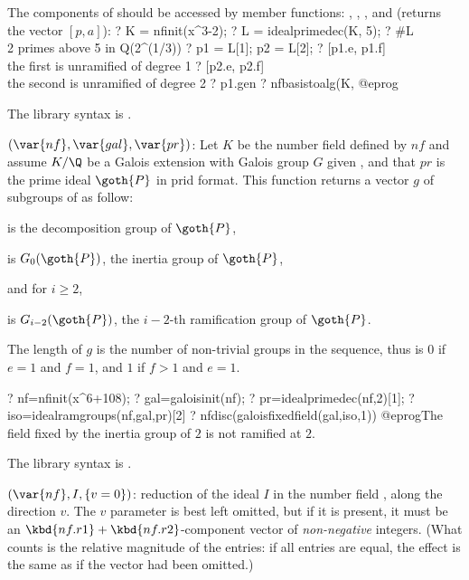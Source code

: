 The components of  should be accessed by member functions: ,
, , and  (returns the vector $[p,a]$):
\bprog
? K = nfinit(x^3-2);
? L = idealprimedec(K, 5);
? #L       \\ 2 primes above 5 in Q(2^(1/3))
? p1 = L[1]; p2 = L[2];
? [p1.e, p1.f]    \\ the first is unramified of degree 1
? [p2.e, p2.f]    \\ the second is unramified of degree 2
? p1.gen
? nfbasistoalg(K, %
@eprog

The library syntax is .

$(\var{nf},\var{gal},\var{pr})$: \label{se:idealramgroups}Let $K$ be the number field defined by $nf$ and assume $K/\Q$ be a
Galois extension with Galois group $G$ given ,
and that $pr$ is the prime ideal $\goth{P}$ in prid format.
This function returns a vector $g$ of subgroups of 
as follow:

\item {} is the decomposition group of $\goth{P}$,

\item {} is $G_0(\goth{P})$, the inertia group of $\goth{P}$,

and for $i\geq 2$,

\item {} is $G_{i-2}(\goth{P})$, the $i-2$-th ramification group of
$\goth{P}$.

The length of $g$ is the number of non-trivial groups in the sequence, thus
is $0$ if $e=1$ and $f=1$, and $1$ if $f>1$ and $e=1$.

\bprog
? nf=nfinit(x^6+108);
? gal=galoisinit(nf);
? pr=idealprimedec(nf,2)[1];
? iso=idealramgroups(nf,gal,pr)[2]
? nfdisc(galoisfixedfield(gal,iso,1))
@eprog\noindent The field fixed by the inertia group of $2$ is not ramified at
$2$.

The library syntax is .

$(\var{nf},I,\{v=0\})$: \label{se:idealred} reduction of
the ideal $I$ in the number field , along the direction $v$.
The $v$ parameter is best left omitted, but if it is present, it must
be an $\kbd{nf.r1} + \kbd{nf.r2}$-component vector of \emph{non-negative}
integers. (What counts is the relative magnitude of the entries: if all
entries are equal, the effect is the same as if the vector had been omitted.)

